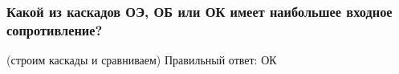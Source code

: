\subsubsection{Какой из каскадов ОЭ, ОБ или ОК имеет наибольшее входное сопротивление?}
(строим каскады и сравниваем)
Правильный ответ: ОК
